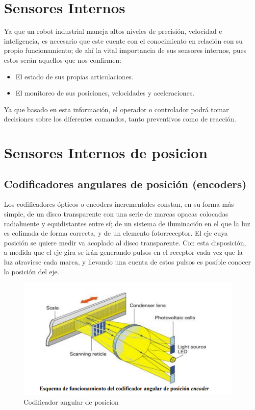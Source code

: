 \section{Sensores Internos}

Ya que un robot industrial maneja altos niveles de precisión, velocidad e inteligencia, es necesario que este cuente con el conocimiento en relación con su propio funcionamiento; de ahí la vital importancia de sus sensores internos, pues estos serán aquellos que nos confirmen:
    \begin{itemize}
        \item El estado de sus propias articulaciones.
        \item El monitoreo de sus posiciones, velocidades y aceleraciones.
    \end{itemize}
Ya que basado en esta información, el operador o controlador podrá tomar decisiones sobre los diferentes comandos, tanto preventivos como de reacción.

\section{Sensores Internos de posicion}
\subsection{Codificadores angulares de posición (encoders)}

Los codificadores ópticos o encoders incrementales constan, en su forma más simple, de un disco transparente con una serie de marcas opacas colocadas radialmente y equidistantes entre sí; de un sistema de iluminación en el que la luz es colimada de forma correcta, y de un elemento fotorreceptor. El eje cuya posición se quiere medir va acoplado al disco transparente. Con esta disposición, a medida que el eje gira se irán generando pulsos en el receptor cada vez que la luz atraviese cada marca, y llevando una cuenta de estos pulsos es posible conocer la posición del eje.



\begin{figure}[h]
	\centering
	\includegraphics[width=0.7\linewidth]{img/codificador angular de posicion.png}
	\caption{Codificador angular de posicion}
	\label{fig:insertarimagen}
\end{figure}

